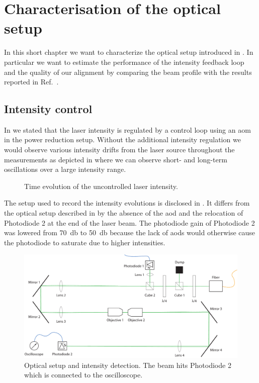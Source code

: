 \chapter{Characterisation of the optical setup}\label{ch:optical_setup}

In this short chapter we want to characterize the optical setup introduced in
. In particular we want to estimate the
performance of the intensity feedback loop and the quality of our alignment
by comparing the beam profile with the results reported in
Ref.~\cite{Hertlein2017}.

\section{Intensity control}

In  we stated that the laser intensity is
regulated by a control loop using an \gls{aom} in the power reduction setup.
Without the additional intensity regulation we would
observe various intensity drifts from the laser source throughout the
measurements as depicted in  where we can
observe short- and long-term oscillations over a large intensity range.
\begin{figure}[htb]
  \centering
  \begin{adjustbox}{width=\textwidth}
    
  \end{adjustbox}
  \caption{Time evolution of the uncontrolled laser intensity.
  }\label{fig:intensity_uncontrolled}
\end{figure}
The setup used to record the intensity evolutions is disclosed in
. It differs from the optical setup
described in  by the absence of the \gls{aod}
and the relocation of Photodiode \num{2} at the end of the laser beam. The
photodiode gain of Photodiode \num{2} was lowered from \SI{70}{\decibel} to
\SI{50}{\decibel} because the lack of \gls{aod}s would otherwise cause the
photodiode to saturate due to higher intensities.
\begin{figure}[htb]
  \centering
  \includegraphics[width=\textwidth]{../media/setup/intensity-control.pdf}
  \caption{Optical setup and intensity detection. The beam hits Photodiode 2
    which is connected to the oscilloscope.
  }\label{fig:intensity_control_setup}
\end{figure}
